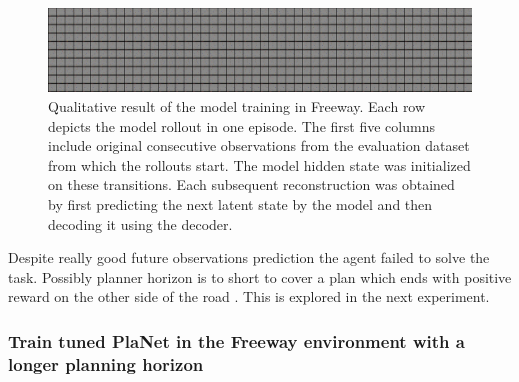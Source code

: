 \begin{figure}[H]
\includegraphics[width=1\textwidth,keepaspectratio]{figures/PlaNet/Freeway_memory_sharp.png}
\caption[Qualitative result of the PlaNet model training with a lower divergence scale in Freeway]{Qualitative result of the model training in Freeway. Each row depicts the model rollout in one episode. The first five columns include original consecutive observations from the evaluation dataset from which the rollouts start. The model hidden state was initialized on these transitions. Each subsequent reconstruction was obtained by first predicting the next latent state by the model and then decoding it using the decoder.}
\label{Fig.PlaNet_Freeway_lower_divergence_scale}
\end{figure}

Despite really good future observations prediction the agent failed to solve the task.  Possibly planner horizon is to short to cover a plan which ends with positive reward on the other side of the road . This is explored in the next experiment.

\subsubsection{Train tuned PlaNet in the Freeway environment with a longer planning horizon}

